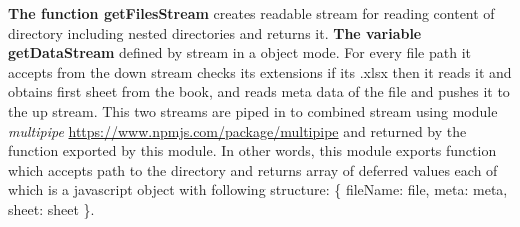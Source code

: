 \textbf{The function getFilesStream} creates readable stream for reading content of directory including nested directories and returns it. 
\textbf{The variable getDataStream} defined by stream in a object mode. For every file path it accepts from the down stream  checks its extensions if its .xlsx then it reads it and obtains first sheet from the book, and reads meta data of the file and pushes it to the up stream.
This two streams are piped in to combined stream using module \textit{multipipe} \url{https://www.npmjs.com/package/multipipe} and returned by the function exported by this module.
In other words, this module exports function which accepts path to the directory and returns array of deferred values each of which is a javascript object with following structure: \{ fileName: file, meta: meta, sheet: sheet \}.


%
%


